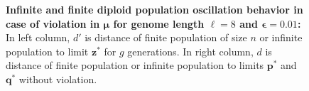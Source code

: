 \begin{figure}[h]
\begin{center}
\hspace{-3em}%
\vspace{-0.5em}  \hspace{-3em}%


\caption{\textbf{Infinite and finite diploid population oscillation behavior in case of violation in $\bm{\mu}$ for genome length $\ell = 8$ and $\bm{\epsilon} = 0.01$:} 
  In left column, $d'$ is distance of finite population of size $n$ or infinite population to limit $\bm{z}^\ast$ for $g$ generations. In right column, $d$ is distance of finite population or infinite population to limits $\bm{p}^\ast$ and $\bm{q}^\ast$ without violation.}
\label{oscillation_8d_vio_mu_0.01}
\end{center}
\end{figure}

